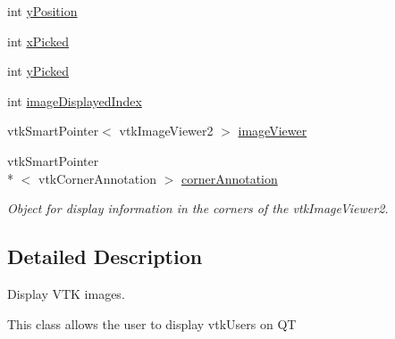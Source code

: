 \begin{DoxyCompactItemize}
\item 
int \hyperlink{class_q_v_t_k_image_widget_a6724caff3a614db8321deaa70532255c}{y\-Position}
\item 
int \hyperlink{class_q_v_t_k_image_widget_a17897def9ef084b36378099c51f94be3}{x\-Picked}
\item 
int \hyperlink{class_q_v_t_k_image_widget_a484346a1e5c956917e7e35a22aee125a}{y\-Picked}
\item 
int \hyperlink{class_q_v_t_k_image_widget_af88ceea1f8553e4773e50b0362ffec3a}{image\-Displayed\-Index}
\item 
vtk\-Smart\-Pointer$<$ vtk\-Image\-Viewer2 $>$ \hyperlink{class_q_v_t_k_image_widget_aea73088ee5e4070c846427b8756cbfff}{image\-Viewer}
\item 
vtk\-Smart\-Pointer\\*
$<$ vtk\-Corner\-Annotation $>$ \hyperlink{class_q_v_t_k_image_widget_a4c5a9fab33dfc90a74abe775fb6c50f5}{corner\-Annotation}
\begin{DoxyCompactList}\small\item\em Object for display information in the corners of the vtk\-Image\-Viewer2. \end{DoxyCompactList}\end{DoxyCompactItemize}


\subsection{Detailed Description}
Display V\-T\-K images. 

This class allows the user to display vtk\-Users on Q\-T 


